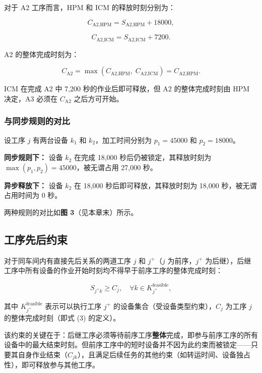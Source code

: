 \documentclass[UTF8,a4paper,12pt]{ctexart}
\begin{document}
对于 A2 工序而言，HPM 和 ICM 的释放时刻分别为：

\begin{equation}
C_{\text{A2},\text{HPM}} = S_{\text{A2},\text{HPM}} + 18000,
\end{equation}

\begin{equation}
C_{\text{A2},\text{ICM}} = S_{\text{A2},\text{ICM}} + 7200.
\end{equation}

A2 的整体完成时刻为：

\begin{equation}
C_{\text{A2}} = \max(C_{\text{A2},\text{HPM}}, \; C_{\text{A2},\text{ICM}}) = C_{\text{A2},\text{HPM}}.
\end{equation}

ICM 在完成 A2 中 7,200 秒的作业后即可释放，但 A2 的整体完成时刻由 HPM 决定，A3 必须在 $C_{\text{A2}}$ 之后方可开始。

\subsubsection{与同步规则的对比}
设工序 $j$ 有两台设备 $k_1$ 和 $k_2$，加工时间分别为 $p_1 = 45000$ 和 $p_2 = 18000$。

\textbf{同步规则下：} 设备 $k_2$ 在完成 18,000 秒后仍被锁定，其释放时刻为 $\max(p_1, p_2) = 45000$，被无谓占用 27,000 秒。

\textbf{异步释放下：} 设备 $k_2$ 在 18,000 秒后即可释放，其释放时刻为 18,000 秒，被无谓占用时间为 0 秒。

两种规则的对比如\textbf{图 3}（见本章末）所示。

\subsection{工序先后约束}
对于同车间内有直接先后关系的两道工序 $j$ 和 $j^+$（$j$ 为前序，$j^+$ 为后继），后继工序中所有设备的作业开始时刻均不得早于前序工序的整体完成时刻：

\begin{equation}
S_{j^+k} \geq C_j, \quad \forall k \in K_{j^+}^{\text{feasible}},
\end{equation}

其中 $K_{j^+}^{\text{feasible}}$ 表示可以执行工序 $j^+$ 的设备集合（受设备类型约束），$C_j$ 为工序 $j$ 的整体完成时刻（即式 (3) 的定义）。

该约束的关键在于：后继工序必须等待前序工序\textbf{整体}完成，即参与前序工序的所有设备中的最大结束时刻。但前序工序中的短时设备并不因为此约束而被锁定——只要其自身作业结束（$C_{jk}$），且满足后续任务的其他约束（如转运时间、设备独占性），即可释放参与其他工序。
\end{document}
